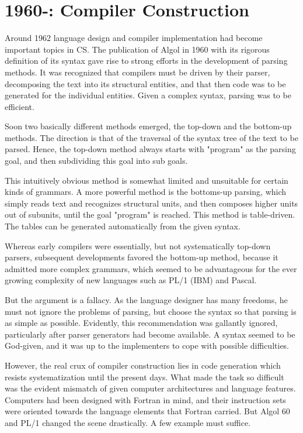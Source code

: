 \section{1960-: Compiler Construction}
Around 1962 language design and compiler implementation had become important
topics in CS. The publication of Algol in 1960 with its rigorous definition of
its syntax gave rise to strong efforts in the development of parsing methods. It
was recognized that compilers must be driven by their parser, decomposing the
text into its structural entities, and that then code was to be generated for
the individual entities. Given a complex syntax, parsing was to be efficient.

Soon two basically different methods emerged, the top-down and the bottom-up
methods. The direction is that of the traversal of the syntax tree of the text
to be parsed. Hence, the top-down method always starts with "program" as the
parsing goal, and then subdividing this goal into sub goals.

This intuitively obvious method is somewhat limited and unsuitable for certain
kinds of grammars. A more powerful method is the bottoms-up parsing, which
simply reads text and recognizes structural units, and then composes higher units
out of subunits, until the goal "program" is reached. This method is table-driven.
The tables can be generated automatically from the given syntax.

Whereas early compilers were essentially, but not systematically top-down parsers,
subsequent developments favored the bottom-up method, because it admitted more
complex grammars, which seemed to be advantageous for the ever growing complexity
of new languages such as PL/1 (IBM) and Pascal.

But the argument is a fallacy. As the language designer has many freedoms, he
must not ignore the problems of parsing, but choose the syntax so that parsing is
as simple as possible. Evidently, this recommendation was gallantly ignored,
particularly after parser generators had become available. A syntax seemed to be
God-given, and it was up to the implementers to cope with possible difficulties.

However, the real crux of compiler construction lies in code generation which
resists systematization until the present days. What made the task so difficult
was the evident mismatch of given computer architectures and language features.
Computers had been designed with Fortran in mind, and their instruction sets were
oriented towards the language elements that Fortran carried. But Algol 60 and
PL/1 changed the scene drastically. A few example must suffice.

